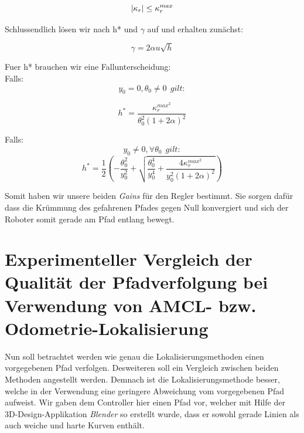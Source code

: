 \documentclass[11pt,a4paper]{article}
\DeclarePairedDelimiter\abs{\lvert}{\rvert}
\begin{document}
\begin{equation}
  \abs{\kappa_r} \leq \kappa_r^{max}
\end{equation}

Schlussendlich lösen wir nach h* und $\gamma$ auf und erhalten zunächst:

\begin{equation}
  \gamma = 2\alpha u \sqrt{h}
\end{equation}

Fuer h* brauchen wir eine Fallunterscheidung: \\
Falls:
\begin{equation*}
  y_0 = 0, \theta_0 \neq 0~~ gilt:
\end{equation*}

\begin{equation}
  h^* = \frac{\kappa_r^{max^2}}{\theta_0^2(1+2\alpha)^2}
\end{equation}

Falls:
\begin{equation*}
  y_0 \neq 0, \forall \theta_0~~ gilt:
\end{equation*}
\begin{equation}
  h^* = \frac{1}{2}\left(-\frac{\theta_0^2}{y_0^2} + \sqrt{ \frac{\theta_0^4}{y_0^4}+ \frac {4\kappa_r^{max^2}} {y_0^2(1+2\alpha)^2} } \right)
\end{equation}

Somit haben wir unsere beiden \textit{Gains} für den Regler bestimmt. Sie sorgen dafür dass die Krümmung des gefahrenen Pfades gegen Null konvergiert und sich der Roboter 
somit gerade am Pfad entlang bewegt. 


\section{Experimenteller Vergleich der Qualität der Pfadverfolgung bei Verwendung von AMCL-  bzw. Odometrie-Lokalisierung}
Nun soll betrachtet werden wie genau die Lokalisierungsmethoden einen vorgegebenen Pfad verfolgen. Desweiteren soll ein Vergleich zwischen beiden Methoden angestellt werden. 
Demnach ist die Lokalisierungsmethode besser, welche in der Verwendung eine geringere Abweichung vom vorgegebenen Pfad aufweist. 
Wir gaben dem Controller hier einen Pfad vor, welcher mit Hilfe der 3D-Design-Applikation \textit{Blender} so erstellt wurde, dass er sowohl
gerade Linien als auch weiche und harte Kurven enthält.
\end{document}
